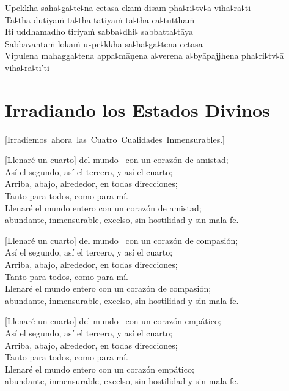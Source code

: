 Upekkhā-saha꜕ga꜕te꜕na cetasā ekaṁ disaṁ pha꜕ri꜕tv꜕ā viha꜕ra꜕ti\\
Ta꜕thā dutiyaṁ ta꜕thā tatiyaṁ ta꜕thā ca꜕tutthaṁ\\
Iti uddhamadho tiriyaṁ sabba꜕dhi꜕ sabbatta꜕tāya\\
Sabbāvantaṁ lokaṁ u꜕pe꜕kkhā-sa꜕ha꜕ga꜕tena cetasā\\
Vipulena mahagga꜕tena appa꜕māṇena a꜕verena a꜕byāpajjhena pha꜕ri꜕tv꜕ā viha꜕ra꜕tī'ti

\chapter*[Irradiando los Estados  Divinos]{Irradiando los Estados Divinos}

\enlargethispage{\baselineskip}


\begin{leader}
  \vspace*{-\baselineskip}
  \mbox{[Irradiemos ahora las Cuatro Cualidades Inmensurables.]}
\end{leader}

[Llenaré un cuarto] del mundo \pause\ con un corazón de amistad;\\
Así el segundo, así el tercero, y así el cuarto;\\
Arriba, abajo, alrededor, en todas direcciones;\\
Tanto para todos, como para mí.\\
Llenaré el mundo entero con un corazón de amistad;\\ abundante, inmensurable, excelso, sin hostilidad y sin mala fe.

[Llenaré un cuarto] del mundo \pause\ con un corazón de compasión;\\
Así el segundo, así el tercero, y así el cuarto;\\
Arriba, abajo, alrededor, en todas direcciones;\\
Tanto para todos, como para mí.\\
Llenaré el mundo entero con un corazón de compasión;\\ abundante, inmensurable, excelso, sin hostilidad y sin mala fe.

[Llenaré un cuarto] del mundo \pause\ con un corazón empático;\\
Así el segundo, así el tercero, y así el cuarto;\\
Arriba, abajo, alrededor, en todas direcciones;\\
Tanto para todos, como para mí.\\
Llenaré el mundo entero con un corazón empático;\\ abundante, inmensurable, excelso, sin hostilidad y sin mala fe.

